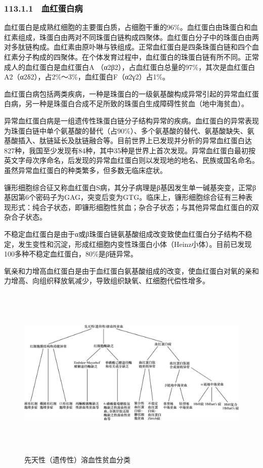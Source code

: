 \subsubsection{113.1.1　血红蛋白病}

血红蛋白是成熟红细胞的主要蛋白质，占细胞干重的96\%。血红蛋白由珠蛋白和血红素组成，珠蛋白由两对不同珠蛋白链构成四聚体。血红蛋白分子中的珠蛋白由两对多肽链构成。血红素由原卟啉与铁组成。正常血红蛋白是四条珠蛋白链和四个血红素分子构成的四聚体。在个体发育过程中，血红蛋白的珠蛋白链有所不同。正常成人的血红蛋白是血红蛋白A
（α2β2），占血红蛋白总量的97\%，其次是血红蛋白A2（α2δ2），占2\%～3\%，血红蛋白F（α2γ2）占1\%。

血红蛋白病包括两类疾病，一种是珠蛋白的一级氨基酸构成异常引起的异常血红蛋白病，另一种是珠蛋白合成不足所致的珠蛋白生成障碍性贫血（地中海贫血）。

异常血红蛋白病是一组遗传性珠蛋白链分子结构异常的疾病。血红蛋白的异常表现为珠蛋白链中单个氨基酸的替代（占90\%）、多个氨基酸的替代、氨基酸缺失、氨基酸插入、肽链延长及肽链融合等。目前世界上已发现并分析的异常血红蛋白达827种，我国至少发现有84种，其中35种是世界上首次发现。异常血红蛋白最初按英文字母次序命名，后发现的异常血红蛋白则以发现地的地名、民族或国名命名。虽然异常血红蛋白的种类繁多，但多数无临床症状。

镰形细胞综合征又称血红蛋白S病，其分子病理是β基因发生单一碱基突变，正常β基因第6个密码子为GAG，突变后变为GTG。临床上，镰形细胞综合征有三种表现形式：纯合子状态，即镰形细胞性贫血；杂合子状态；与其他异常血红蛋白的双杂合子状态。

不稳定血红蛋白是由于α或β珠蛋白链氨基酸组成改变致使血红蛋白分子结构不稳定，发生变性和沉淀，形成红细胞内变性珠蛋白小体（Heinz小体）。目前已发现100多种不稳定血红蛋白，80\%是β链异常。

氧亲和力增高血红蛋白是由于血红蛋白氨基酸组成的改变，使血红蛋白对氧的亲和力增高、向组织释放氧减少，导致组织缺氧、红细胞代偿性增多。

\begin{figure}[!htbp]
 \centering
 \includegraphics[width=7.3125in,height=3.29167in]{./images/Image00170.jpg}
 \captionsetup{justification=centering}
 \caption{先天性（遗传性）溶血性贫血分类}
 \label{fig33-2}
  \end{figure} 

